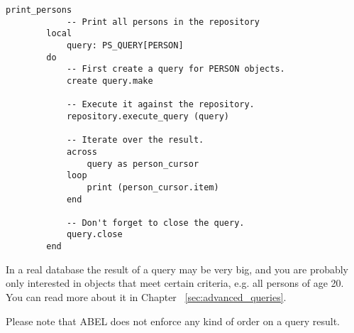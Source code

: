 \documentclass[a4paper,12pt]{report}
\begin{document}
\begin{lstlisting}[language=OOSC2Eiffel, captionpos=b, caption={Print all PERSON objects.}, label={lst:simple_query}]
	print_persons
			-- Print all persons in the repository
		local
			query: PS_QUERY[PERSON]
		do
			-- First create a query for PERSON objects.
			create query.make

			-- Execute it against the repository.
			repository.execute_query (query)

			-- Iterate over the result.
			across
				query as person_cursor
			loop
				print (person_cursor.item)
			end

			-- Don't forget to close the query.
			query.close
		end
\end{lstlisting}
In a real database the result of a query may be very big, and you are probably only interested in objects that meet certain criteria, e.g. all persons of age 20. 
You can read more about it in Chapter ~\ref{sec:advanced_queries}.

Please note that ABEL does not enforce any kind of order on a query result.

%
%
%
%
\end{document}
